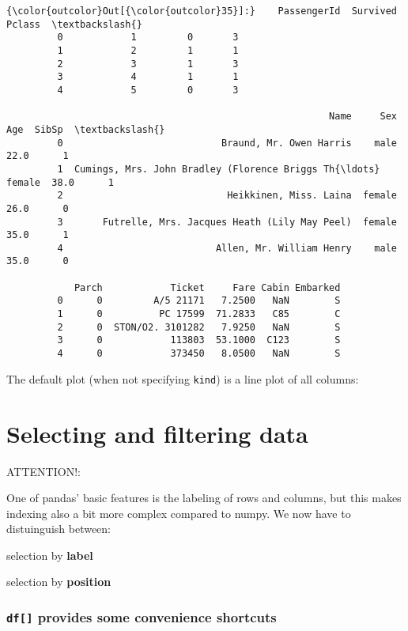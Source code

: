 \documentclass[11pt]{article}
\begin{document}
\begin{Verbatim}[commandchars=\\\{\}]
{\color{outcolor}Out[{\color{outcolor}35}]:}    PassengerId  Survived  Pclass  \textbackslash{}
         0            1         0       3   
         1            2         1       1   
         2            3         1       3   
         3            4         1       1   
         4            5         0       3   
         
                                                         Name     Sex   Age  SibSp  \textbackslash{}
         0                            Braund, Mr. Owen Harris    male  22.0      1   
         1  Cumings, Mrs. John Bradley (Florence Briggs Th{\ldots}  female  38.0      1   
         2                             Heikkinen, Miss. Laina  female  26.0      0   
         3       Futrelle, Mrs. Jacques Heath (Lily May Peel)  female  35.0      1   
         4                           Allen, Mr. William Henry    male  35.0      0   
         
            Parch            Ticket     Fare Cabin Embarked  
         0      0         A/5 21171   7.2500   NaN        S  
         1      0          PC 17599  71.2833   C85        C  
         2      0  STON/O2. 3101282   7.9250   NaN        S  
         3      0            113803  53.1000  C123        S  
         4      0            373450   8.0500   NaN        S  
\end{Verbatim}
            
    The default plot (when not specifying \texttt{kind}) is a line plot of
all columns:

    \hypertarget{selecting-and-filtering-data}{%
\section{Selecting and filtering
data}\label{selecting-and-filtering-data}}

    ATTENTION!:

One of pandas' basic features is the labeling of rows and columns, but
this makes indexing also a bit more complex compared to numpy. We now
have to distuinguish between:

selection by \textbf{label}

selection by \textbf{position}

    \hypertarget{df-provides-some-convenience-shortcuts}{%
\subsubsection{\texorpdfstring{\texttt{df{[}{]}} provides some
convenience
shortcuts}{df{[}{]} provides some convenience shortcuts}}\label{df-provides-some-convenience-shortcuts}}
\end{document}
